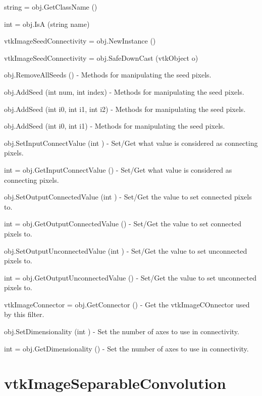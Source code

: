 \begin{DoxyItemize}
\item {\ttfamily string = obj.\-Get\-Class\-Name ()}  
\item {\ttfamily int = obj.\-Is\-A (string name)}  
\item {\ttfamily vtk\-Image\-Seed\-Connectivity = obj.\-New\-Instance ()}  
\item {\ttfamily vtk\-Image\-Seed\-Connectivity = obj.\-Safe\-Down\-Cast (vtk\-Object o)}  
\item {\ttfamily obj.\-Remove\-All\-Seeds ()} -\/ Methods for manipulating the seed pixels.  
\item {\ttfamily obj.\-Add\-Seed (int num, int index)} -\/ Methods for manipulating the seed pixels.  
\item {\ttfamily obj.\-Add\-Seed (int i0, int i1, int i2)} -\/ Methods for manipulating the seed pixels.  
\item {\ttfamily obj.\-Add\-Seed (int i0, int i1)} -\/ Methods for manipulating the seed pixels.  
\item {\ttfamily obj.\-Set\-Input\-Connect\-Value (int )} -\/ Set/\-Get what value is considered as connecting pixels.  
\item {\ttfamily int = obj.\-Get\-Input\-Connect\-Value ()} -\/ Set/\-Get what value is considered as connecting pixels.  
\item {\ttfamily obj.\-Set\-Output\-Connected\-Value (int )} -\/ Set/\-Get the value to set connected pixels to.  
\item {\ttfamily int = obj.\-Get\-Output\-Connected\-Value ()} -\/ Set/\-Get the value to set connected pixels to.  
\item {\ttfamily obj.\-Set\-Output\-Unconnected\-Value (int )} -\/ Set/\-Get the value to set unconnected pixels to.  
\item {\ttfamily int = obj.\-Get\-Output\-Unconnected\-Value ()} -\/ Set/\-Get the value to set unconnected pixels to.  
\item {\ttfamily vtk\-Image\-Connector = obj.\-Get\-Connector ()} -\/ Get the vtk\-Image\-C\-Onnector used by this filter.  
\item {\ttfamily obj.\-Set\-Dimensionality (int )} -\/ Set the number of axes to use in connectivity.  
\item {\ttfamily int = obj.\-Get\-Dimensionality ()} -\/ Set the number of axes to use in connectivity.  
\end{DoxyItemize}\hypertarget{vtkimaging_vtkimageseparableconvolution}{}\section{vtk\-Image\-Separable\-Convolution}\label{vtkimaging_vtkimageseparableconvolution}

